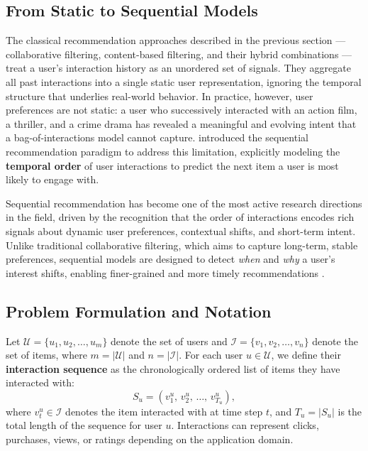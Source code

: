 \documentclass[12pt,a4paper]{report}
\newcommand{\textcite}[1]{\citet{#1}}
\newcommand{\parencite}[1]{\citep{#1}}
\begin{document}
\subsection{From Static to Sequential Models}

The classical recommendation approaches described in the previous
section --- collaborative filtering, content-based filtering, and
their hybrid combinations --- treat a user's interaction history as
an unordered set of signals. They aggregate all past interactions
into a single static user representation, ignoring the temporal
structure that underlies real-world behavior. In practice, however,
user preferences are not static: a user who successively interacted
with an action film, a thriller, and a crime drama has revealed a
meaningful and evolving intent that a bag-of-interactions model
cannot capture. \textcite{wang2019sequential} introduced the
sequential recommendation paradigm to address this limitation,
explicitly modeling the \textbf{temporal order} of user interactions
to predict the next item a user is most likely to engage with.

Sequential recommendation has become one of the most active research
directions in the field, driven by the recognition that the order of
interactions encodes rich signals about dynamic user preferences,
contextual shifts, and short-term intent. Unlike traditional
collaborative filtering, which aims to capture long-term, stable
preferences, sequential models are designed to detect \textit{when}
and \textit{why} a user's interest shifts, enabling finer-grained
and more timely recommendations \parencite{wang2019sequential}.

\subsection{Problem Formulation and Notation}

Let $\mathcal{U} = \{u_1, u_2, \ldots, u_m\}$ denote the set of
users and $\mathcal{I} = \{v_1, v_2, \ldots, v_n\}$ denote the set
of items, where $m = |\mathcal{U}|$ and $n = |\mathcal{I}|$.
For each user $u \in \mathcal{U}$, we define their \textbf{interaction
sequence} as the chronologically ordered list of items they have
interacted with:
\begin{equation}
  S_u = \left( v_1^u,\, v_2^u,\, \ldots,\, v_{T_u}^u \right),
\end{equation}
where $v_t^u \in \mathcal{I}$ denotes the item interacted with at
time step $t$, and $T_u = |S_u|$ is the total length of the sequence
for user $u$. Interactions can represent clicks, purchases, views,
or ratings depending on the application domain.
\end{document}
